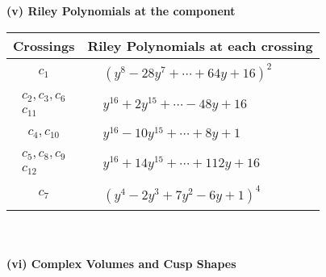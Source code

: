 \documentclass[1p]{elsarticle_modified}
\theoremstyle{definition}
\begin{document}
\flushleft \textbf{(v) Riley Polynomials at the component}\newline \\
\begin{tabular}{m{50pt}|m{274pt}}
Crossings & \hspace{64pt}Riley Polynomials at each crossing \\
\hline $$\begin{aligned}c_{1}\end{aligned}$$&$\begin{aligned}
&(y^8-28 y^7+\cdots+64 y+16)^{2}
\end{aligned}$\\
\hline $$\begin{aligned}c_{2},c_{3},c_{6}\\c_{11}\end{aligned}$$&$\begin{aligned}
&y^{16}+2 y^{15}+\cdots-48 y+16
\end{aligned}$\\
\hline $$\begin{aligned}c_{4},c_{10}\end{aligned}$$&$\begin{aligned}
&y^{16}-10 y^{15}+\cdots+8 y+1
\end{aligned}$\\
\hline $$\begin{aligned}c_{5},c_{8},c_{9}\\c_{12}\end{aligned}$$&$\begin{aligned}
&y^{16}+14 y^{15}+\cdots+112 y+16
\end{aligned}$\\
\hline $$\begin{aligned}c_{7}\end{aligned}$$&$\begin{aligned}
&(y^4-2 y^3+7 y^2-6 y+1)^4
\end{aligned}$\\
\hline
\end{tabular}\\~\\
\newpage\flushleft \textbf{(vi) Complex Volumes and Cusp Shapes}
\end{document}
